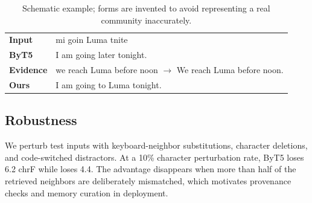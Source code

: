 \begin{table}[t]
  \centering
  \caption{Schematic example; forms are invented to avoid representing a real
  community inaccurately.}
  \label{tab:example}
  \small
  \setlength{\tabcolsep}{5pt}
  \begin{tabular}{>{\bfseries}p{}p{}}
    \toprule
    Input & mi goin Luma tnite \\
    ByT5 & I am going later tonight. \\
    Evidence & we reach Luma before noon $\rightarrow$ We reach Luma before noon. \\
    Ours & I am going to Luma tonight. \\
    \bottomrule
  \end{tabular}
\end{table}

\subsection{Robustness}

We perturb test inputs with keyboard-neighbor substitutions, character
deletions, and code-switched distractors. At a 10\% character perturbation
rate, ByT5 loses 6.2 chrF while \method loses 4.4. The advantage disappears
when more than half of the retrieved neighbors are deliberately mismatched,
which motivates provenance checks and memory curation in deployment.

